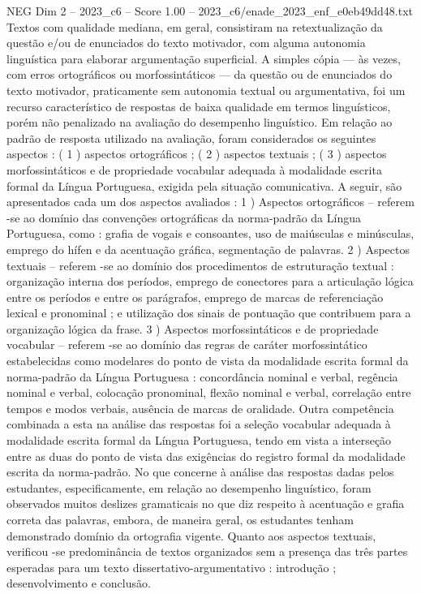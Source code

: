 \begin{textsample}{NEG Dim 2 – 2023\_c6 – Score 1.00 – 2023\_c6/enade\_2023\_enf\_e0eb49dd48.txt}
Textos com qualidade mediana, em geral, consistiram na retextualização da questão e/ou de enunciados do texto motivador, com alguma autonomia linguística para elaborar argumentação superficial.
A simples cópia — às vezes, com erros ortográficos ou morfossintáticos — da questão ou de enunciados do texto motivador, praticamente sem autonomia textual ou argumentativa, foi um recurso característico de respostas de baixa qualidade em termos linguísticos, porém não penalizado na avaliação do desempenho linguístico.
Em relação ao padrão de resposta utilizado na avaliação, foram considerados os seguintes aspectos : ( 1 ) aspectos ortográficos ; ( 2 ) aspectos textuais ; ( 3 ) aspectos morfossintáticos e de propriedade vocabular adequada à modalidade escrita formal da Língua Portuguesa, exigida pela situação comunicativa.
A seguir, são apresentados cada um dos aspectos avaliados : 1 ) Aspectos ortográficos – referem -se ao domínio das convenções ortográficas da norma-padrão da Língua Portuguesa, como : grafia de vogais e consoantes, uso de maiúsculas e minúsculas, emprego do hífen e da acentuação gráfica, segmentação de palavras. 2 ) Aspectos textuais – referem -se ao domínio dos procedimentos de estruturação textual : organização interna dos períodos, emprego de conectores para a articulação lógica entre os períodos e entre os parágrafos, emprego de marcas de referenciação lexical e pronominal ; e utilização dos sinais de pontuação que contribuem para a organização lógica da frase. 3 ) Aspectos morfossintáticos e de propriedade vocabular – referem -se ao domínio das regras de caráter morfossintático estabelecidas como modelares do ponto de vista da modalidade escrita formal da norma-padrão da Língua Portuguesa : concordância nominal e verbal, regência nominal e verbal, colocação pronominal, flexão nominal e verbal, correlação entre tempos e modos verbais, ausência de marcas de oralidade.
Outra competência combinada a esta na análise das respostas foi a seleção vocabular adequada à modalidade escrita formal da Língua Portuguesa, tendo em vista a interseção entre as duas do ponto de vista das exigências do registro formal da modalidade escrita da norma-padrão.
No que concerne à análise das respostas dadas pelos estudantes, especificamente, em relação ao desempenho linguístico, foram observados muitos deslizes gramaticais no que diz respeito à acentuação e grafia correta das palavras, embora, de maneira geral, os estudantes tenham demonstrado domínio da ortografia vigente.
Quanto aos aspectos textuais, verificou -se predominância de textos organizados sem a presença das três partes esperadas para um texto dissertativo-argumentativo : introdução ; desenvolvimento e conclusão.

\end{textsample}
